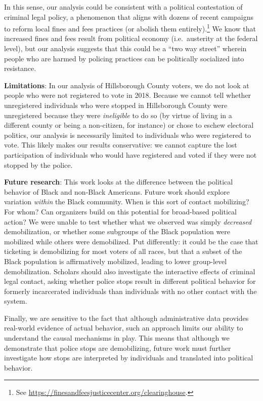 \documentclass[
  12pt,
]{article}
\begin{document}
In this sense, our analysis could be consistent with a political contestation of criminal legal policy, a phenomenon that aligns with dozens of recent campaigns to reform local fines and fees practices (or abolish them entirely).\footnote{See \url{https://finesandfeesjusticecenter.org/clearinghouse}.} We know that increased fines and fees result from political economy (i.e.~austerity at the federal level), but our analysis suggests that this could be a ``two way street'' wherein people who are harmed by policing practices can be politically socialized into resistance.

\textbf{Limitations}: In our analysis of Hillsborough County voters, we do not look at people who were not registered to vote in 2018. Because we cannot tell whether unregistered individuals who were stopped in Hillsborough County were unregistered because they were \emph{ineligible} to do so (by virtue of living in a different county or being a non-citizen, for instance) or chose to eschew electoral politics, our analysis is necessarily limited to individuals who were registered to vote. This likely makes our results conservative: we cannot capture the lost participation of individuals who would have registered and voted if they were not stopped by the police.

\textbf{Future research}: This work looks at the difference between the political behavior of Black and non-Black Americans. Future work should explore variation \emph{within} the Black community. When is this sort of contact mobilizing? For whom? Can organizers build on this potential for broad-based political action? We were unable to test whether what we observed was simply \emph{decreased} demobilization, or whether some subgroups of the Black population were mobilized while others were demobilized. Put differently: it could be the case that ticketing is demobilizing for most voters of all races, but that a subset of the Black population is affirmatively mobilized, leading to lower group-level demobilization. Scholars should also investigate the interactive effects of criminal legal contact, asking whether police stops result in different political behavior for formerly incarcerated individuals than individuals with no other contact with the system.

Finally, we are sensitive to the fact that although administrative data provides real-world evidence of actual behavior, such an approach limits our ability to understand the causal mechanisms in play. This means that although we demonstrate that police stops are demobilizing, future work must further investigate how stops are interpreted by individuals and translated into political behavior.
\end{document}

